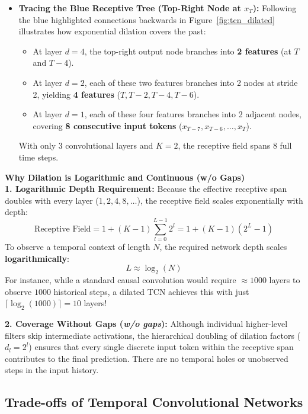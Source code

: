 \begin{itemize}[leftmargin=*]
    \item \textbf{Tracing the Blue Receptive Tree (Top-Right Node at $x_T$):}
    Following the blue highlighted connections backwards in Figure~\ref{fig:tcn_dilated} illustrates how exponential dilation covers the past:
    \begin{itemize}[nosep]
        \item At layer $d=4$, the top-right output node branches into \textbf{2 features} (at $T$ and $T-4$).
        \item At layer $d=2$, each of these two features branches into 2 nodes at stride 2, yielding \textbf{4 features} ($T, T-2, T-4, T-6$).
        \item At layer $d=1$, each of these four features branches into 2 adjacent nodes, covering \textbf{8 consecutive input tokens} ($x_{T-7}, x_{T-6}, \dots, x_T$).
    \end{itemize}
    With only 3 convolutional layers and $K=2$, the receptive field spans 8 full time steps.
\end{itemize}

\begin{keywordbox}
\textbf{Why Dilation is Logarithmic and Continuous (w/o Gaps)} \\
\textbf{1. Logarithmic Depth Requirement:} Because the effective receptive span doubles with every layer ($1, 2, 4, 8, \dots$), the receptive field scales exponentially with depth:
\[ \text{Receptive Field} = 1 + (K - 1) \sum_{l=0}^{L-1} 2^l = 1 + (K - 1)(2^L - 1) \]
To observe a temporal context of length $N$, the required network depth scales \textbf{logarithmically}:
\[ L \approx \log_2(N) \]
For instance, while a standard causal convolution would require $\approx 1000$ layers to observe $1000$ historical steps, a dilated TCN achieves this with just $\lceil \log_2(1000) \rceil = 10$ layers!

\textbf{2. Coverage Without Gaps (\textit{w/o gaps}):} Although individual higher-level filters skip intermediate activations, the hierarchical doubling of dilation factors ($d_l = 2^l$) ensures that every single discrete input token within the receptive span contributes to the final prediction. There are no temporal holes or unobserved steps in the input history.
\end{keywordbox}

\subsection{Trade-offs of Temporal Convolutional Networks}

